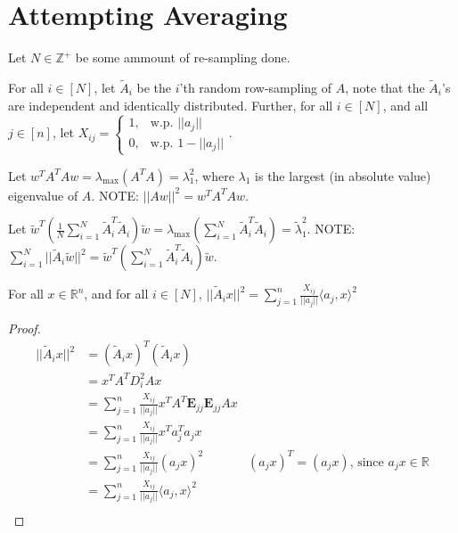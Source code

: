 \section{Attempting Averaging}

Let $N \in \mathbb{Z}^+$ be some ammount of re-sampling done.

For all $i \in [N]$, let $\tilde A_i$ be the $i$'th random row-sampling of $A$, note that the $\tilde A_i$'s are independent and identically distributed. Further, for all $i \in [N]$, and all $j \in [n]$, let  
$X_{ij} = \begin{cases}
    1, &\text{w.p. } ||a_j||\\
    0, & \text{w.p. } 1 - ||a_j||
\end{cases}$.  

Let $w^T A^TAw = \lambda_{\max}(A^TA) = \lambda_1^2$, where $\lambda_1$ is the largest (in absolute value) eigenvalue of $A$. NOTE: $||Aw||^2 = w^T A^TAw$.

Let $\tilde w^T (\frac{1}{N}\sum_{i=1}^N \tilde A^T_i\tilde A_i) \tilde w = \lambda_{\max}(\sum_{i=1}^N \tilde A^T_i\tilde A_i) = \tilde \lambda_1^2$. NOTE: $\sum_{i=1}^N ||\tilde A_i \tilde w||^2 = \tilde w^T (\sum_{i=1}^N \tilde A^T_i\tilde A_i) \tilde w $.

\begin{lemma}
\label{||tilde A_i x||^2 = sum_j=1^n fracX_ij||a_j||langle a_j, xrangle ^2}
    For all $x \in \mathbb{R}^{n}$, and for all $i \in [N]$, $||\tilde A_i x||^2 = \sum_{j=1}^n \frac{X_{ij}}{||a_j||}\langle a_j, x\rangle ^2$
\end{lemma}

\begin{proof}
    \begin{align*}
        ||\tilde A_ix||^2 &= (\tilde A_ix)^T(\tilde A_ix)\\
        &= x^TA^TD_i^2Ax\\
        &= \sum_{j=1}^n \frac{X_{ij}}{||a_j||}x^TA^T\textbf{E}_{jj}\textbf{E}_{jj}Ax\\
        &= \sum_{j=1}^n \frac{X_{ij}}{||a_j||}x^Ta_j^Ta_jx\\
        &= \sum_{j=1}^n \frac{X_{ij}}{||a_j||}(a_jx)^2 & (a_jx)^T = (a_jx) \text{, since } a_jx \in \mathbb{R}\\
        &= \sum_{j=1}^n \frac{X_{ij}}{||a_j||}\langle a_j, x\rangle ^2\\
    \end{align*}
\end{proof}


